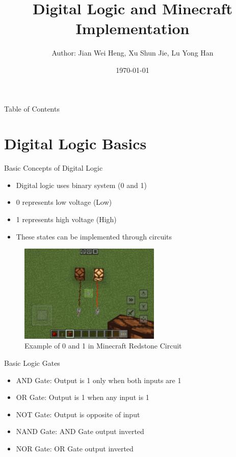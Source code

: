 \documentclass{beamer}
\title{Digital Logic and Minecraft Implementation}
\author{Author: Jian Wei Heng, Xu Shun Jie, Lu Yong Han}
\institute{Fu Jen Catholic University}
\date{\today}
\begin{document}
\begin{frame}
    \titlepage
\end{frame}

\begin{frame}{Table of Contents}
    \tableofcontents
\end{frame}

\section{Digital Logic Basics}
\begin{frame}{Basic Concepts of Digital Logic}
    \begin{itemize}
        \item Digital logic uses binary system (0 and 1)
        \item 0 represents low voltage (Low)
        \item 1 represents high voltage (High)
        \item These states can be implemented through circuits
    \end{itemize}
    \begin{figure}[ht]
        \centering
        \includegraphics[width=0.6\textwidth]{images/zero_and_one_gate.png}
        \caption{Example of 0 and 1 in Minecraft Redstone Circuit}
    \end{figure}
\end{frame}

\begin{frame}{Basic Logic Gates}
    \begin{itemize}
        \item AND Gate: Output is 1 only when both inputs are 1
        \item OR Gate: Output is 1 when any input is 1
        \item NOT Gate: Output is opposite of input
        \item NAND Gate: AND Gate output inverted
        \item NOR Gate: OR Gate output inverted
    \end{itemize}
\end{frame}
\end{document}
